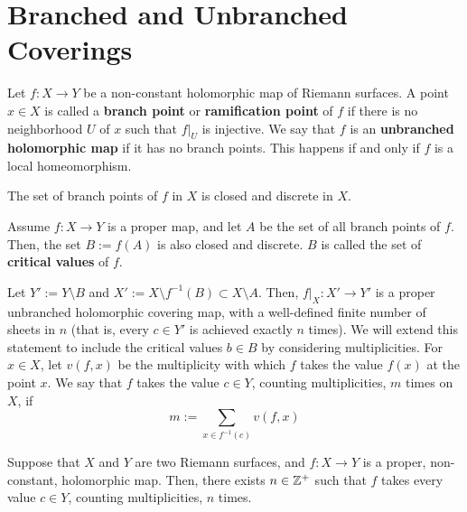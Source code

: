 \documentclass[11pt]{article}
\begin{document}
\section{Branched and Unbranched Coverings}

\begin{defn}
    Let $f:X \to Y$ be a non-constant holomorphic map of Riemann surfaces. A point $x \in X$ is called a \textbf{branch point} or \textbf{ramification point} of $f$ if there is no neighborhood $U$ of $x$ such that $f|_U$ is injective. We say that $f$ is an \textbf{unbranched holomorphic map} if it has no branch points. This happens if and only if $f$ is a local homeomorphism. 
\end{defn}

\begin{rmk}
    The set of branch points of $f$ in $X$ is closed and discrete in $X$.
\end{rmk}

\begin{defn}
Assume $f:X \to Y$ is a proper map, and let $A$ be the set of all branch points of $f$. Then, the set $B:= f(A)$ is also closed and discrete. $B$ is called the set of \textbf{critical values} of $f$. 
\end{defn}

Let $Y' :=Y \setminus B$ and $X' := X \setminus f^{-1}(B) \subset X \setminus A$. Then, $f|_X : X' \to Y'$ is a proper unbranched holomorphic covering map, with a well-defined finite number of sheets in $n$ (that is, every $c \in Y'$ is achieved exactly $n$ times). We will extend this statement to include the critical values $b \in B$ by considering multiplicities. For $x \in X$, let $v(f,x)$ be the multiplicity with which $f$ takes the value $f(x)$ at the point $x$. We say that $f$ takes the value $c \in Y$, counting multiplicities, $m$ times on $X$, if
$$m := \sum_{x \in f^{-1}(c)}v(f,x)$$

\begin{thm}[][label=thm:sheet_counting]
    Suppose that $X$ and $Y$ are two Riemann surfaces, and $f:X \to Y$ is a proper, non-constant, holomorphic map. Then, there exists $n \in \mathbb{Z}^+$ such that $f$ takes every value $c \in Y$, counting multiplicities, $n$ times.
\end{thm}
\end{document}
